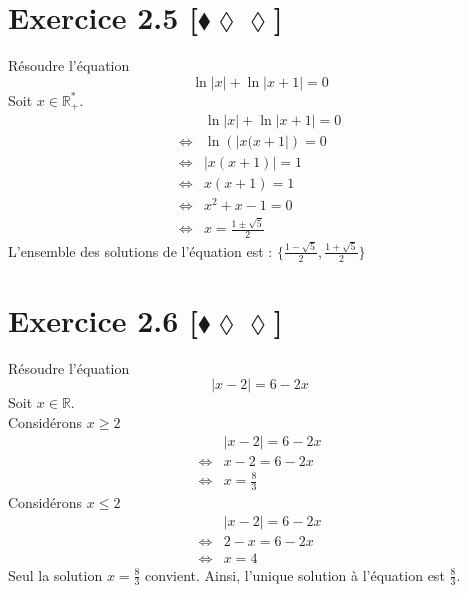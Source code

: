 \documentclass[10pt]{article}
\begin{document}
\section*{Exercice 2.5 [$\blacklozenge\lozenge\lozenge$]}
\begin{tcolorbox}[enhanced, width=6in, center, size=fbox, fontupper=\large, drop shadow southwest]
    Résoudre l'équation
    \begin{equation*}
        \ln|x|+\ln|x+1|=0
    \end{equation*}
    Soit $x\in\mathbb{R}^*_+$.
    \begin{align*}
        &\ln|x|+\ln|x+1|=0\\
        \iff&\ln\left(|x(x+1|\right)=0\\
        \iff&|x(x+1)|=1\\
        \iff&x(x+1)=1\\
        \iff&x^2+x-1=0\\
        \iff&x=\frac{1\pm\sqrt{5}}{2}
    \end{align*}
    L'ensemble des solutions de l'équation est : $\{\frac{1-\sqrt{5}}{2},\frac{1+\sqrt{5}}{2}\}$
\end{tcolorbox}

\section*{Exercice 2.6 [$\blacklozenge\lozenge\lozenge$]}
\begin{tcolorbox}[enhanced, width=6in, center, size=fbox, fontupper=\large, drop shadow southwest]
    Résoudre l'équation
    \begin{equation*}
        |x-2|=6-2x
    \end{equation*}
    Soit $x\in\mathbb{R}$.\\
    Considérons $x\geq2$
    \begin{align*}
        &|x-2|=6-2x\\
        \iff&x-2=6-2x\\
        \iff&x=\frac{8}{3}
    \end{align*}
    Considérons $x\leq2$
    \begin{align*}
        &|x-2|=6-2x\\
        \iff&2-x=6-2x\\
        \iff&x=4
    \end{align*}
    Seul la solution $x=\frac{8}{3}$ convient.
    Ainsi, l'unique solution à l'équation est $\frac{8}{3}$.
\end{tcolorbox}
\end{document}
